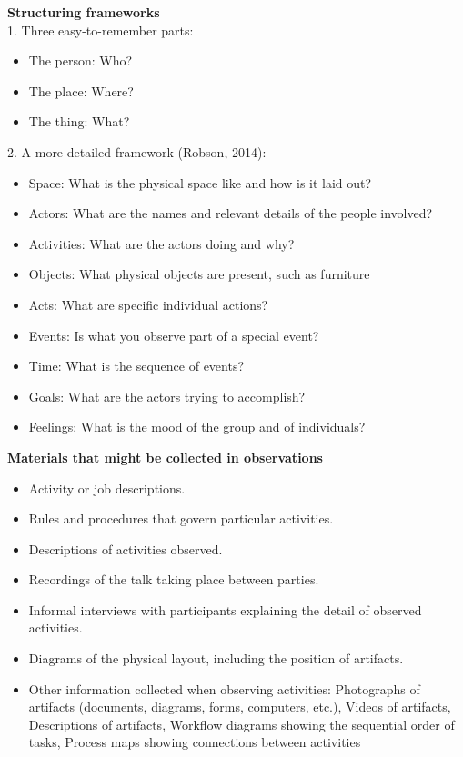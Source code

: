 \textbf{Structuring frameworks}\\
1. Three easy-to-remember parts:
\begin{itemize}
\item The person: Who?
\item The place: Where?
\item The thing: What?
\end{itemize}
2. A more detailed framework (Robson, 2014):
\begin{itemize}
\item Space: What is the physical space like and how is it laid out?
\item Actors: What are the names and relevant details of the people involved?
\item Activities: What are the actors doing and why?
\item Objects: What physical objects are present, such as furniture
\item Acts: What are specific individual actions?
\item Events: Is what you observe part of a special event?
\item Time: What is the sequence of events?
\item Goals: What are the actors trying to accomplish?
\item Feelings: What is the mood of the group and of individuals?
\end{itemize}

\textbf{Materials that might be collected in observations}
\begin{itemize}
\item Activity or job descriptions.
\item Rules and procedures that govern particular activities.
\item Descriptions of activities observed.
\item Recordings of the talk taking place between parties.
\item Informal interviews with participants explaining the detail of observed activities.
\item Diagrams of the physical layout, including the position of artifacts.
\item Other information collected when observing activities: Photographs of artifacts (documents, diagrams, forms, computers, etc.), Videos of artifacts, Descriptions of artifacts, Workflow diagrams showing the sequential order of tasks, Process maps showing connections between activities
\end{itemize}
